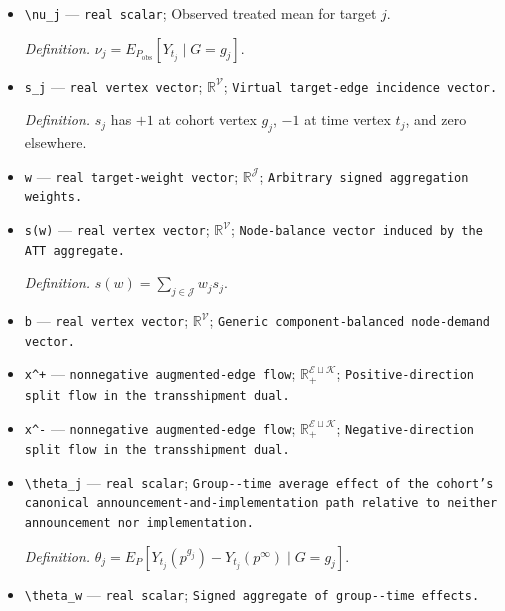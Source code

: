 \documentclass{article}
\begin{document}
\begin{itemize}
  \item \texttt{\textbackslash{}\allowbreak{}nu\_\allowbreak{}j} --- \texttt{real scalar}; Observed treated mean for target \(j\).
  \par\smallskip\noindent\emph{Definition.} \(\nu_j=E_{P_{\mathrm{obs}}}[Y_{t_j}\mid G=g_j]\).
  \item \texttt{s\_\allowbreak{}j} --- \texttt{real vertex vector}; \(\mathbb R^{\mathcal V}\); \texttt{Virtual target-\allowbreak{}edge incidence vector.}
  \par\smallskip\noindent\emph{Definition.} \(s_j\) has \(+1\) at cohort vertex \(g_j\), \(-1\) at time vertex \(t_j\), and zero elsewhere.
  \item \texttt{w} --- \texttt{real target-\allowbreak{}weight vector}; \(\mathbb R^{\mathcal J}\); \texttt{Arbitrary signed aggregation weights.}
  \item \texttt{s(w)} --- \texttt{real vertex vector}; \(\mathbb R^{\mathcal V}\); \texttt{Node-\allowbreak{}balance vector induced by the ATT aggregate.}
  \par\smallskip\noindent\emph{Definition.} \(s(w)=\sum_{j\in\mathcal J}w_js_j\).
  \item \texttt{b} --- \texttt{real vertex vector}; \(\mathbb R^{\mathcal V}\); \texttt{Generic component-\allowbreak{}balanced node-\allowbreak{}demand vector.}
  \item \texttt{x\textasciicircum{}+\allowbreak{}} --- \texttt{nonnegative augmented-\allowbreak{}edge flow}; \(\mathbb R_+^{\mathcal E\sqcup\mathcal K}\); \texttt{Positive-\allowbreak{}direction split flow in the transshipment dual.}
  \item \texttt{x\textasciicircum{}-\allowbreak{}} --- \texttt{nonnegative augmented-\allowbreak{}edge flow}; \(\mathbb R_+^{\mathcal E\sqcup\mathcal K}\); \texttt{Negative-\allowbreak{}direction split flow in the transshipment dual.}
  \item \texttt{\textbackslash{}\allowbreak{}theta\_\allowbreak{}j} --- \texttt{real scalar}; \texttt{Group-\allowbreak{}-\allowbreak{}time average effect of the cohort's canonical announcement-\allowbreak{}and-\allowbreak{}implementation path relative to neither announcement nor implementation.}
  \par\smallskip\noindent\emph{Definition.} \(\theta_j=E_P[Y_{t_j}(p^{g_j})-Y_{t_j}(p^\infty)\mid G=g_j]\).
  \item \texttt{\textbackslash{}\allowbreak{}theta\_\allowbreak{}w} --- \texttt{real scalar}; \texttt{Signed aggregate of group-\allowbreak{}-\allowbreak{}time effects.}

\end{itemize}
\end{document}
